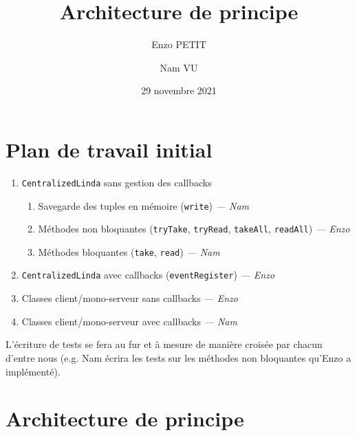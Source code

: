 \documentclass[headings=standardclasses,parskip=half]{scrartcl}
\title{Architecture de principe}
\subtitle{}
\author{Enzo PETIT \and Nam VU}
\date{29 novembre 2021}
\begin{document}
\maketitle

% 

\section*{Plan de travail initial}

\begin{enumerate}
    \item \texttt{CentralizedLinda} sans gestion des callbacks
          \begin{enumerate}
              \item Savegarde des tuples en mémoire (\texttt{write}) \emph{— Nam}
              \item Méthodes non bloquantes 
              (\texttt{tryTake}, \texttt{tryRead}, \texttt{takeAll}, \texttt{readAll}) \emph{— Enzo}
              \item Méthodes bloquantes (\texttt{take}, \texttt{read}) \emph{— Nam}
          \end{enumerate}
    \item \texttt{CentralizedLinda} avec callbacks (\texttt{eventRegister}) \emph{— Enzo}
    \item Classes client/mono-serveur sans callbacks \emph{— Enzo}
    \item Classes client/mono-serveur avec callbacks \emph{— Nam}
\end{enumerate}

L'écriture de tests se fera au fur et à mesure de manière croisée par chacun d'entre nous
(e.g. Nam écrira les tests sur les méthodes non bloquantes qu'Enzo a implémenté).

\section*{Architecture de principe}
\end{document}
